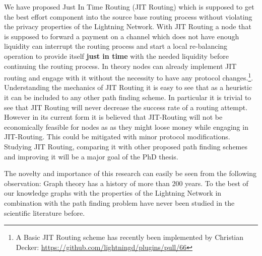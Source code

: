 \documentclass[a4paper]{paper}
\begin{document}
We have proposed Just In Time Routing (JIT Routing) \cite{pickhardt2019jit} which is supposed to get the best effort component into the source base routing process without violating the privacy properties of the Lightning Network.
With JIT Routing a node that is supposed to forward a payment on a channel which does not have enough liquidity can interrupt the routing process and start a local re-balancing operation to provide itself \textbf{just in time} with the needed liquidity before continuing the routing process.
In theory nodes can already implement JIT routing and engage with it without the necessity to have any protocol changes.\footnote{A Basic JIT Routing scheme has recently been implemented by Christian Decker: \url{https://github.com/lightningd/plugins/pull/66}}.
Understanding the mechanics of JIT Routing it is easy to see that as a heuristic it can be included to any other path finding scheme.
In particular it is trivial to see that JIT Routing will never decrease the success rate of a routing attempt.
However in its current form it is believed that JIT-Routing will not be economically feasible for nodes as as they might loose money while engaging in JIT-Routing. This could be mitigated with minor protocol modifications. Studying JIT Routing, comparing it with other proposed path finding schemes and improving it will be a major goal of the PhD thesis. 

The novelty and importance of this research can easily be seen from the following observation:
Graph theory has a history of more than 200 years.
To the best of our knowledge graphs with the properties of the Lightning Network in combination with the path finding problem have never been studied in the scientific literature before.
\end{document}
